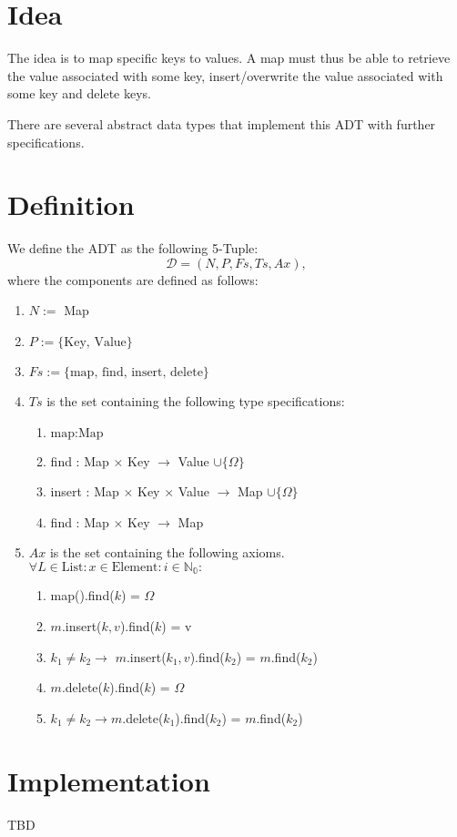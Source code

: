 \documentclass{article}
\begin{document}
\section*{Idea}
The idea is to map specific keys to values. A map must thus be able to retrieve the value associated with some key, insert/overwrite the value associated with some key and delete keys.

There are several abstract data types that implement this ADT with further specifications.

\section*{Definition}
We define the ADT as the following 5-Tuple:
\[\mathcal{D} = (N, P, Fs, Ts, Ax),\]
where the components are defined as follows:

\begin{enumerate}
 \item \(N :=\) Map
 \item \(P := \{ \text{Key, Value} \}\)
 \item \(Fs := \{ \text{map, find, insert, delete} \}\)
 \item \(Ts\) is the set containing the following type specifications:
	\begin{enumerate}
		\item \( \text{map} : \text{Map} \)
		\item find : Map \(\times\) Key \(\rightarrow\) Value \(\cup \{\Omega\}\)
		\item insert : Map \(\times\) Key \(\times\) Value \(\rightarrow\) Map \(\cup \{\Omega\}\)
		\item find : Map \(\times\) Key \(\rightarrow\) Map
	\end{enumerate}
 \item \(Ax\) is the set containing the following axioms. \\
	\(\forall L \in \text{List} : x \in \text{Element} : i \in \mathbb{N_0} :\)
	\begin{enumerate}
		\item map().find(\(k\)) = \(\Omega\)
  \item \(m\).insert(\(k, v\)).find(\(k\)) = v
  \item \(k_1 \ne k_2 \rightarrow\) \(m\).insert(\(k_1, v\)).find(\(k_2\)) = \(m\).find(\(k_2\))
  \item \(m\).delete(\(k\)).find(\(k\)) = \(\Omega\)
  \item \(k_1 \ne k_2 \rightarrow m\).delete(\(k_1\)).find(\(k_2\)) = \(m\).find(\(k_2\))
	\end{enumerate}
\end{enumerate}


\section*{Implementation}
TBD
\end{document}
